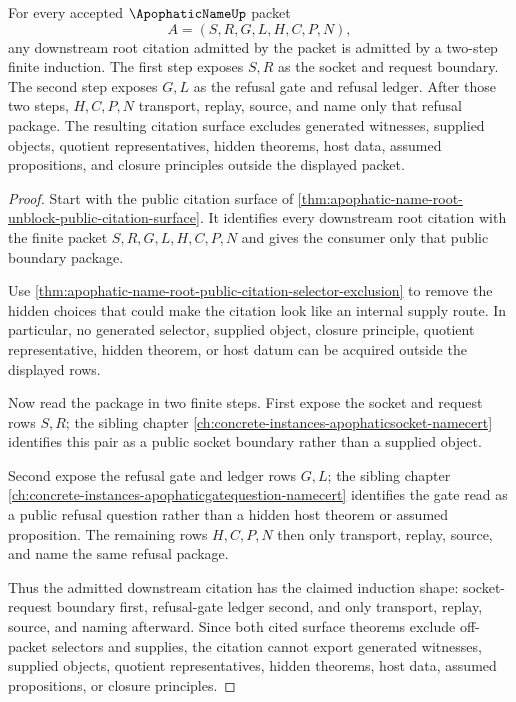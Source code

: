 \begin{theorem}
\label{thm:apophatic-name-two-step-refusal-ledger-induction}
For every accepted $\ApophaticNameUp$ packet
$$
A=(S,R,G,L,H,C,P,N),
$$
any downstream root citation admitted by the packet is admitted by a two-step finite induction. The first step exposes $S,R$ as the socket and request boundary. The second step exposes $G,L$ as the refusal gate and refusal ledger. After those two steps, $H,C,P,N$ transport, replay, source, and name only that refusal package. The resulting citation surface excludes generated witnesses, supplied objects, quotient representatives, hidden theorems, host data, assumed propositions, and closure principles outside the displayed packet.
\end{theorem}
\begin{proof}
Start with the public citation surface of \autoref{thm:apophatic-name-root-unblock-public-citation-surface}. It identifies every downstream root citation with the finite packet $S,R,G,L,H,C,P,N$ and gives the consumer only that public boundary package.

Use \autoref{thm:apophatic-name-root-public-citation-selector-exclusion} to remove the hidden choices that could make the citation look like an internal supply route. In particular, no generated selector, supplied object, closure principle, quotient representative, hidden theorem, or host datum can be acquired outside the displayed rows.

Now read the package in two finite steps. First expose the socket and request rows $S,R$; the sibling chapter \autoref{ch:concrete-instances-apophaticsocket-namecert} identifies this pair as a public socket boundary rather than a supplied object.

Second expose the refusal gate and ledger rows $G,L$; the sibling chapter \autoref{ch:concrete-instances-apophaticgatequestion-namecert} identifies the gate read as a public refusal question rather than a hidden host theorem or assumed proposition. The remaining rows $H,C,P,N$ then only transport, replay, source, and name the same refusal package.

Thus the admitted downstream citation has the claimed induction shape: socket-request boundary first, refusal-gate ledger second, and only transport, replay, source, and naming afterward. Since both cited surface theorems exclude off-packet selectors and supplies, the citation cannot export generated witnesses, supplied objects, quotient representatives, hidden theorems, host data, assumed propositions, or closure principles.
\end{proof}
